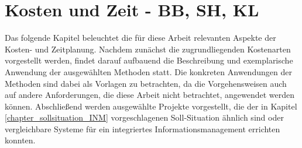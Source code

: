 
\chapter{Kosten und Zeit - BB, SH, KL}

Das folgende Kapitel beleuchtet die für diese Arbeit relevanten Aspekte der Kosten- und Zeitplanung. Nachdem zunächst die zugrundliegenden Kostenarten vorgestellt werden, findet darauf aufbauend die Beschreibung und exemplarische Anwendung der ausgewählten Methoden statt. Die konkreten Anwendungen der Methoden sind dabei als Vorlagen zu betrachten, da die Vorgehensweisen auch auf andere Anforderungen, die diese Arbeit nicht betrachtet, angewendet werden k\"onnen. Abschließend werden ausgew\"ahlte Projekte vorgestellt, die der in Kapitel \ref{chapter_sollsituation_INM} vorgeschlagenen Soll-Situation \"ahnlich sind oder vergleichbare Systeme f\"ur ein integriertes Informationsmanagement errichten konnten.





\clearpage


